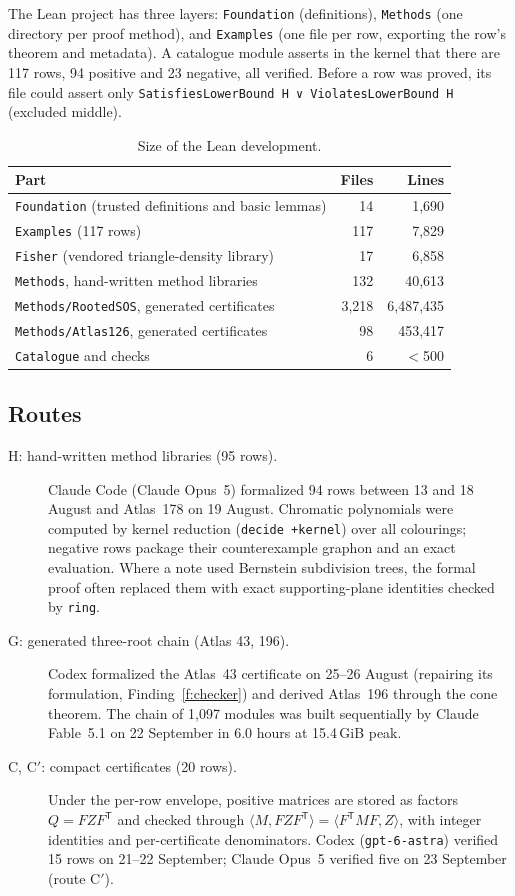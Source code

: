 \documentclass[11pt,a4paper]{article}
\newcommand{\ttt}[1]{\texttt{#1}}
\begin{document}
The Lean project has three layers: \ttt{Foundation} (definitions), \ttt{Methods} (one directory per proof
method), and \ttt{Examples} (one file per row, exporting the row's theorem and metadata). A catalogue module
asserts in the kernel that there are 117 rows, 94 positive and 23 negative, all verified. Before a row was
proved, its file could assert only \ttt{SatisfiesLowerBound H ∨ ViolatesLowerBound H} (excluded middle).

\begin{table}[h]
\centering\small
\caption{Size of the Lean development.}
\begin{tabular}{@{}lrr@{}}
\toprule
Part & Files & Lines\\ \midrule
\ttt{Foundation} (trusted definitions and basic lemmas) & 14 & 1,690\\
\ttt{Examples} (117 rows) & 117 & 7,829\\
\ttt{Fisher} (vendored triangle-density library) & 17 & 6,858\\
\ttt{Methods}, hand-written method libraries & 132 & 40,613\\
\ttt{Methods/RootedSOS}, generated certificates & 3,218 & 6,487,435\\
\ttt{Methods/Atlas126}, generated certificates & 98 & 453,417\\
\ttt{Catalogue} and checks & 6 & $<$500\\ \bottomrule
\end{tabular}
\end{table}

\subsection{Routes}

\begin{description}
\item[H: hand-written method libraries (95 rows).] Claude Code (Claude Opus~5) formalized 94 rows between 13 and
  18 August and Atlas~178 on 19 August. Chromatic polynomials were computed by kernel reduction
  (\ttt{decide +kernel}) over all colourings; negative rows package their counterexample graphon and an exact
  evaluation. Where a note used Bernstein subdivision trees, the formal proof often replaced them with exact
  supporting-plane identities checked by \ttt{ring}.
\item[G: generated three-root chain (Atlas 43, 196).] Codex formalized the Atlas~43 certificate on 25--26 August
  (repairing its formulation, Finding~\ref{f:checker}) and derived Atlas~196 through the cone theorem. The chain
  of 1,097 modules was built sequentially by Claude Fable~5.1 on 22 September in 6.0 hours at 15.4\,GiB peak.
\item[C, C$'$: compact certificates (20 rows).] Under the per-row envelope, positive matrices are stored as
  factors $Q=FZF^{\mathsf T}$ and checked through $\langle M,FZF^{\mathsf T}\rangle=\langle F^{\mathsf
  T}MF,Z\rangle$, with integer identities and per-certificate denominators. Codex (\ttt{gpt-6-astra}) verified 15
  rows on 21--22 September; Claude Opus~5 verified five on 23 September (route C$'$).
\end{description}
\end{document}
